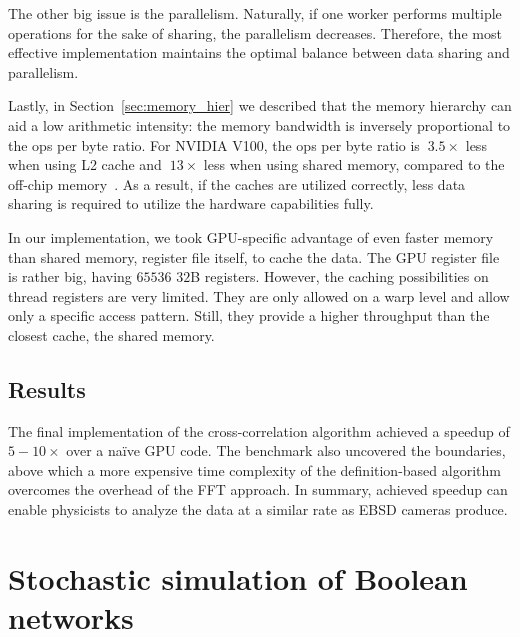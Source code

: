 The other big issue is the parallelism. Naturally, if one worker performs multiple operations for the sake of sharing, the parallelism decreases. Therefore, the most effective implementation maintains the optimal balance between data sharing and parallelism.

Lastly, in Section~\ref{sec:memory_hier} we described that the memory hierarchy can aid a low arithmetic intensity: the memory bandwidth is inversely proportional to the ops per byte ratio. For NVIDIA V100, the ops per byte ratio is $~3.5\times$ less when using L2 cache and $~13\times$ less when using shared memory, compared to the off-chip memory~\cite{jia2018dissecting}. As a result, if the caches are utilized correctly, less data sharing is required to utilize the hardware capabilities fully.

In our implementation, we took GPU-specific advantage of even faster memory than shared memory, register file itself, to cache the data. The GPU register file is rather big, having $65536$ $32$B registers. However, the caching possibilities on thread registers are very limited. They are only allowed on a warp level and allow only a specific access pattern. Still, they provide a higher throughput than the closest cache, the shared memory.

\subsection{Results}

The final implementation of the cross-correlation algorithm achieved a speedup of $5-10\times$ over a na\"{i}ve GPU code. The benchmark also uncovered the boundaries, above which a more expensive time complexity of the definition-based algorithm overcomes the overhead of the FFT approach. In summary, achieved speedup can enable physicists to analyze the data at a similar rate as EBSD cameras produce.


\section{Stochastic simulation of Boolean networks}
\label{sec:maboss}



